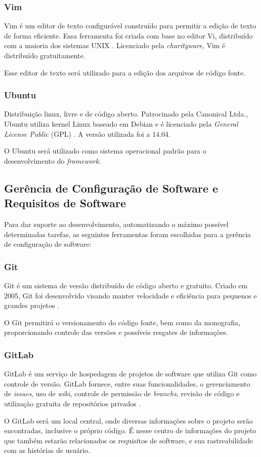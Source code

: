 \subsubsection{Vim}
Vim é um editor de texto configurável construído para permitir a edição de texto de forma eficiente. Essa ferramenta foi criada com base no editor Vi, distribuído com a maioria dos sistemas UNIX \cite{vim}. Licenciado pela \textit{charityware}, Vim é distribuído gratuitamente. 
\par
\indent Esse editor de texto será utilizado para a edição dos arquivos de código fonte.

\subsubsection{Ubuntu}
Distribuição linux, livre e de código aberto. Patrocinado pela Canonical Ltda., Ubuntu utiliza kernel Linux baseado em Debian e é licenciado pela \textit{General License Public} (GPL) \cite{ubuntu2010}. A versão utilizada foi a 14.04.
\par
\indent O Ubuntu será utilizado como sistema operacional padrão para o desenvolvimento do \textit{framework}.

\subsection{Gerência de Configuração de Software e Requisitos de Software}
Para dar suporte ao desenvolvimento, automatizando o máximo possível determinadas tarefas, as seguintes ferramentas foram escolhidas para a gerência de configuração de software:

\subsubsection{Git}
Git é um sistema de versão distribuído de código aberto e gratuito. Criado em 2005, Git foi desenvolvido visando manter velocidade e eficiência para pequenos e grandes projetos \cite{git2015}. 
\par
\indent O Git permitirá o versionamento do código fonte, bem como da monografia, proporcionando controle das versões e possíveis resgates de informações.

\subsubsection{GitLab}
GitLab é um serviço de hospedagem de projetos de software que utiliza Git como controle de versão. GitLab fornece, entre suas funcionalidades, o gerenciamento de \textit{issues}, uso de \textit{wiki}, controle de permissão de \textit{branchs}, revisão de código e utilização gratuita de repositórios privados \cite{gitlab}.
\par
\indent O GitLab será um local central, onde diversas informações sobre o projeto serão encontradas, inclusive o próprio código. É nesse centro de informações do projeto que também estarão relacionados os requisitos de software, e sua rastreabilidade com as histórias de usuário.

